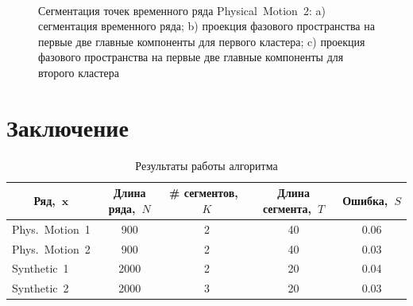 \documentclass[12pt, twoside]{article}
\numberwithin{equation}{section}
\begin{document}
\begin{figure}[h!t]\center
{}
\\
\caption{Сегментация точек временного ряда Physical~Motion~2: 
a) сегментация временного ряда; b) проекция фазового пространства на первые две главные компоненты для первого кластера; c) проекция фазового пространства на первые две главные компоненты для второго кластера}
\label{fig_real_segmentation}
\end{figure}

\section{Заключение}
\begin{table}[h!t]
\begin{center}
\caption{Результаты работы алгоритма}
\label{table_2}
\begin{tabular}{|c|c|c|c|c|}
\hline
	Ряд,~$\textbf{x}$ &Длина ряда,~$N$& \# сегментов,~$K$&Длина сегмента,~$T$& Ошибка,~$S$\\
	\hline
	\multicolumn{1}{|l|}{Phys.~Motion~1}
	& 900& 2& 40& 0.06\\
	\hline
	\multicolumn{1}{|l|}{Phys.~Motion~2}
	& 900& 2& 40& 0.03\\
	\hline
	\multicolumn{1}{|l|}{Synthetic~1}
	& 2000& 2& 20& 0.04\\
	\hline
	\multicolumn{1}{|l|}{Synthetic~2}
	& 2000& 3& 20& 0.03\\
\hline

\end{tabular}
\end{center}
\end{table}
\end{document}
